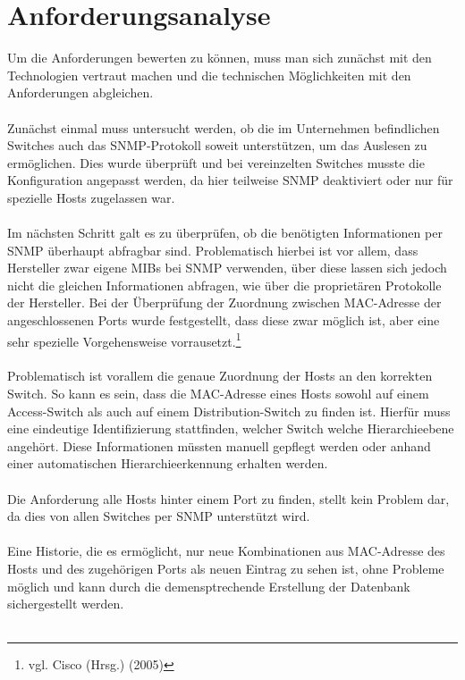\section{Anforderungsanalyse}
\label{sec:anfanalyse}

Um die Anforderungen bewerten zu können, muss man sich zunächst mit den Technologien vertraut machen und die technischen Möglichkeiten mit den Anforderungen abgleichen.\\\\
Zunächst einmal muss untersucht werden, ob die im Unternehmen befindlichen Switches auch das SNMP-Protokoll soweit unterstützen, um das Auslesen zu ermöglichen.
Dies wurde überprüft und bei vereinzelten Switches musste die Konfiguration angepasst werden, da hier teilweise SNMP deaktiviert oder nur für spezielle Hosts zugelassen war.\\\\
Im nächsten Schritt galt es zu überprüfen, ob die benötigten Informationen per SNMP überhaupt abfragbar sind. Problematisch hierbei ist vor allem, dass Hersteller zwar eigene MIBs bei SNMP verwenden, über diese lassen sich jedoch nicht die gleichen Informationen abfragen, wie über die proprietären Protokolle der Hersteller.
Bei der Überprüfung der Zuordnung zwischen MAC-Adresse der angeschlossenen Ports wurde festgestellt, dass diese zwar möglich ist, aber eine sehr spezielle Vorgehensweise vorrausetzt.\footnote{vgl. Cisco (Hrsg.) (2005)}\\\\
Problematisch ist vorallem die genaue Zuordnung der Hosts an den korrekten Switch. So kann es sein, dass die MAC-Adresse eines Hosts sowohl auf einem Access-Switch als auch auf einem Distribution-Switch zu finden ist.
Hierfür muss eine eindeutige Identifizierung stattfinden, welcher Switch welche Hierarchieebene angehört. Diese Informationen müssten manuell gepflegt werden oder anhand einer automatischen Hierarchieerkennung erhalten werden.\\\\
Die Anforderung alle Hosts hinter einem Port zu finden, stellt kein Problem dar, da dies von allen Switches per SNMP unterstützt wird.\\\\
Eine Historie, die es ermöglicht, nur neue Kombinationen aus MAC-Adresse des Hosts und des zugehörigen Ports als neuen Eintrag zu sehen ist, ohne Probleme möglich und kann durch die demensptrechende Erstellung der Datenbank sichergestellt werden.\\\\
